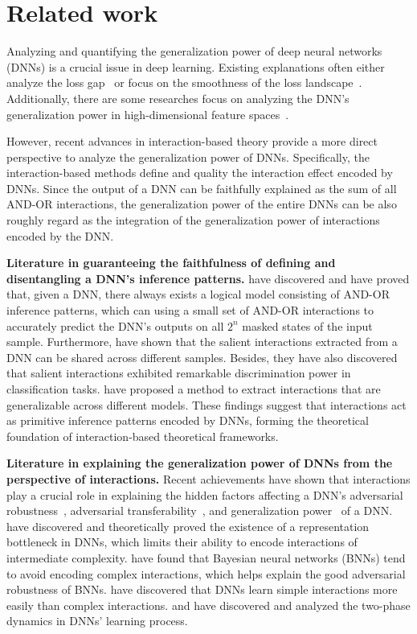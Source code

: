 \section{Related work}
Analyzing and quantifying the generalization power of deep neural networks (DNNs) is a crucial issue in deep learning. Existing explanations often either analyze the loss gap~\cite{generalization_bounds, bousquet2020sharper, deng2021toward, haghifam2020sharpened, haghifam2021towards} or focus on the smoothness of the loss landscape~\cite{flat_minima, loss_lanscape, foret2021sharpness, kwon2021asam}. Additionally, there are some researches focus on analyzing the DNN's generalization power in high-dimensional feature spaces~\citep{petrini2022learning, boopathy2023model, dyballa2024separability, nikolikj2024generalization}.

However, recent advances in interaction-based theory provide a more direct perspective to analyze the generalization power of DNNs. Specifically, the interaction-based methods define and quality the interaction effect encoded by DNNs. Since the output of a DNN can be faithfully explained as the sum of all AND-OR interactions, the generalization power of the entire DNNs can be also roughly regard as the integration of the generalization power of interactions encoded by the DNN.

\textbf{Literature in guaranteeing the faithfulness of defining and disentangling a DNN's inference patterns.} \citet{ren2023AOG} have discovered and \citet{ren2024where} have proved that, given a DNN, there always exists a logical model consisting of AND-OR inference patterns, which can using a small set of AND-OR interactions to accurately predict the DNN's outputs on all $2^n$ masked states of the input sample. Furthermore, \citet{li2023does} have shown that the salient interactions extracted from a DNN can be shared across different samples. Besides, they have also discovered that salient interactions exhibited remarkable discrimination power in classification tasks. \citet{chen2024defining} have proposed a method to extract interactions that are generalizable across different models. These findings suggest that interactions act as primitive inference patterns encoded by DNNs, forming the theoretical foundation of interaction-based theoretical frameworks.

\textbf{Literature in explaining the generalization power of DNNs from the perspective of interactions.} Recent achievements have shown that interactions play a crucial role in explaining the hidden factors affecting a DNN's adversarial robustness~\cite{ren2021towards}, adversarial transferability~\cite{wang2021unified}, and generalization power~\cite{zhou2024generalization} of a DNN. \citet{deng2022discovering} have discovered and theoretically proved the existence of a representation bottleneck in DNNs, which limits their ability to encode interactions of intermediate complexity. \citet{ren2023bayesian} have found that Bayesian neural networks (BNNs) tend to avoid encoding complex interactions, which helps explain the good adversarial robustness of BNNs. \citet{liu2023towards} have discovered that DNNs learn simple interactions more easily than complex interactions. \citet{zhang2024two} and \citet{ren2024towards} have discovered and analyzed the two-phase dynamics in DNNs' learning process.